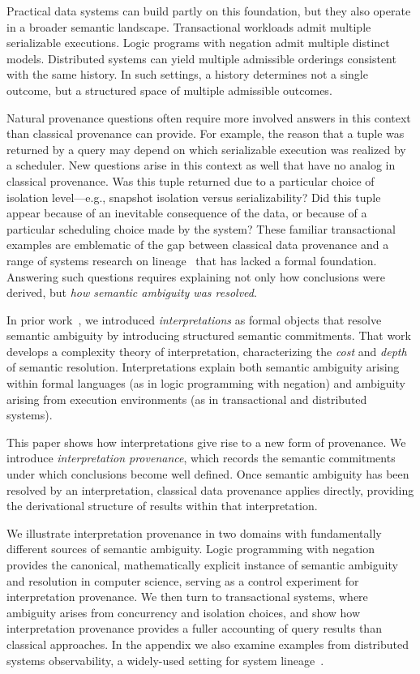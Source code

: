 \documentclass[acmsmall,nonacm]{acmart}
\theoremstyle{remark}
\numberwithin{definition}{section}
\numberwithin{theorem}{section}
\numberwithin{lemma}{section}
\numberwithin{corollary}{section}
\numberwithin{remark}{section}
\numberwithin{example}{section}
\numberwithin{observation}{section}
\numberwithin{assumption}{section}
\begin{document}
Practical data systems can build partly on this foundation, but they also operate in a
broader semantic landscape.
Transactional workloads admit multiple serializable executions.
Logic programs with negation admit multiple distinct models.
Distributed systems can yield multiple admissible orderings consistent with the same
history.
In such settings, a history determines not a single outcome, but a structured
space of multiple admissible outcomes.

Natural provenance questions often require more involved answers in this context
than classical provenance can provide.
For example, the reason that a tuple was
returned by a query may depend on which serializable execution was realized by a scheduler.
New questions arise in this context as well that have no analog in classical provenance.
Was this tuple returned due to a particular choice of isolation level---e.g., snapshot isolation versus serializability?
Did this tuple appear because of an inevitable consequence of the data, or because of a particular scheduling choice made by the system?
These familiar transactional examples are emblematic 
of the gap between classical data provenance and a range of systems research on 
lineage~\cite{sigelman2010dapper,seltzer2005provenance,bates2015trustworthy}
that has lacked a formal foundation.
Answering such questions requires explaining not only how conclusions were derived,
but \emph{how semantic ambiguity was resolved}.

In prior work~\cite{hellerstein2026interpretation}, we introduced
\emph{interpretations} as formal objects that resolve semantic ambiguity by
introducing structured semantic commitments.
That work develops a complexity theory of interpretation, characterizing the
\emph{cost} and \emph{depth} of semantic resolution.
Interpretations explain both semantic ambiguity arising within formal languages
(as in logic programming with negation) and ambiguity arising from execution
environments (as in transactional and distributed systems).

This paper shows how interpretations give rise to a new form of provenance.
We introduce \emph{interpretation provenance}, which records the semantic
commitments under which conclusions become well defined.
Once semantic ambiguity has been resolved by an interpretation, classical data
provenance applies directly, providing the derivational structure of results
within that interpretation.

We illustrate interpretation provenance in two domains with fundamentally different
sources of semantic ambiguity.
Logic programming with negation provides the canonical, mathematically explicit
instance of semantic ambiguity and resolution in computer science, serving as a
control experiment for interpretation provenance.
We then turn to transactional systems, where ambiguity arises from concurrency and
isolation choices, and show how interpretation provenance provides a fuller
accounting of query results than classical approaches. In the appendix we also examine
examples from distributed systems observability, a widely-used setting for system
lineage~\cite{sigelman2010dapper}.
\end{document}
